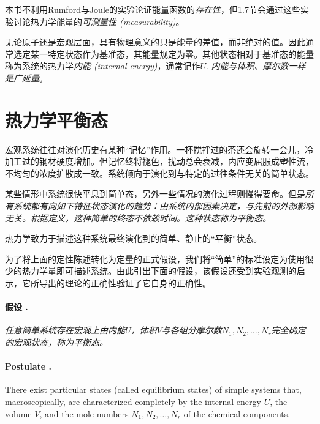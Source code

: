 本书不利用Rumford与Joule的实验论证能量函数的{\it 存在性}，但1.7节会通过这些实验讨论热力学能量的{\it 可测量性 (measurability)}。

无论原子还是宏观层面，具有物理意义的只是能量的差值，而非绝对的值。因此通常选定某一特定状态作为基准态，其能量规定为零。其他状态相对于基准态的能量称为系统的热力学{\it 内能 (internal energy)}，通常记作$U$. {\it 内能与体积、摩尔数一样是广延量}。

\section{热力学平衡态}
\label{sec1.5}

宏观系统往往对演化历史有某种“记忆”作用。一杯搅拌过的茶还会旋转一会儿，冷加工过的钢材硬度增加。但记忆终将褪色，扰动总会衰减，内应变屈服成塑性流，不均匀的浓度扩散成一致。系统倾向于演化到与特定的过往条件无关的简单状态。

某些情形中系统很快平息到简单态，另外一些情况的演化过程则慢得要命。但是{\it 所有系统都有向如下特征状态演化的趋势：由系统内部因素决定，与先前的外部影响无关。根据定义，这种简单的终态不依赖时间。这种状态称为平衡态。}

热力学致力于描述这种系统最终演化到的简单、静止的“平衡”状态。

为了将上面的定性陈述转化为定量的正式假设，我们将“简单”的标准设定为使用很少的热力学量即可描述系统。由此引出下面的假设，该假设还受到实验观测的启示，它所导出的理论的正确性验证了它自身的正确性。

\paragraph{假设 \uppercase\expandafter{}.}
{\it 任意简单系统存在宏观上由内能$U$，体积$V$与各组分摩尔数$N_1, N_2, \dots, N_r$完全确定的宏观状态，称为平衡态。}

\paragraph{Postulate \uppercase\expandafter{}.}
There exist particular states (called equilibrium states) of simple systems that, macroscopically, are characterized completely by the internal energy $U$, the volume $V$, and the mole numbers $N_1, N_2, \dots, N_r$ of the chemical components. 

